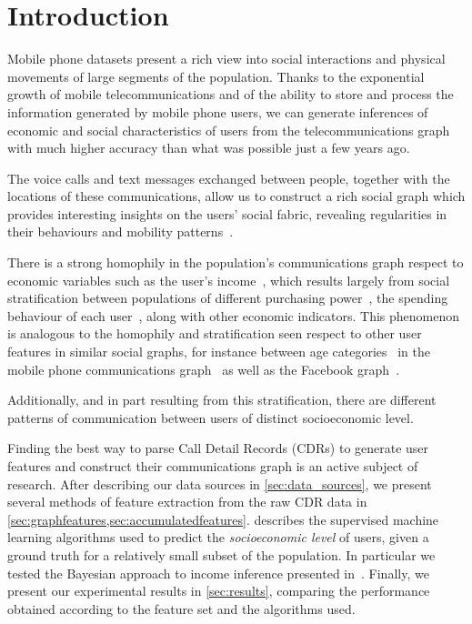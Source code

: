 
\section{Introduction}

Mobile phone datasets present a rich view into social interactions and physical movements of large segments of the population. Thanks to the exponential growth of mobile telecommunications and of the ability to store and process the information generated by mobile phone users, we can generate inferences of economic and social characteristics of users from the telecommunications graph with much higher accuracy than what was possible just a few years ago.

The voice calls and text messages exchanged between people, together with the locations of these communications, allow us to construct a rich social graph which provides interesting insights on the users' social fabric, revealing regularities in their behaviours and mobility patterns~\cite{gonzalez2008understanding,ponieman2013human,sarraute2015city}.

There is a strong homophily in the population's communications graph respect to economic variables such as the user's income~\cite{fixmanasonam2016}, which results largely from social stratification between populations of different purchasing power~\cite{leo2015socioeconomic}, the spending behaviour of each user~\cite{singh2013predicting}, along with other economic indicators.
This phenomenon is analogous to the homophily and stratification seen respect to other user features in similar social graphs, for instance between age categories~\cite{mcpherson2001birds} in the mobile phone communications graph~\cite{sarraute2014} as well as the Facebook graph~\cite{ugander2011anatomy}.

Additionally, and in part resulting from this stratification, there are different patterns of communication between users of distinct socioeconomic level.

Finding the best way to parse Call Detail Records (CDRs) to generate user features and construct their communications graph is an active subject of research.  After describing our data sources in \cref{sec:data_sources}, we present several methods of feature extraction from the raw CDR data in \cref{sec:graphfeatures,sec:accumulatedfeatures}.  describes the supervised machine learning algorithms used to predict the \emph{socioeconomic level} of users, given a ground truth for a relatively small subset of the population. In particular we tested the Bayesian approach to income inference presented in~\cite{fixmanasonam2016}. Finally, we present our experimental results in \cref{sec:results}, comparing the performance obtained according to the feature set and the algorithms used.
